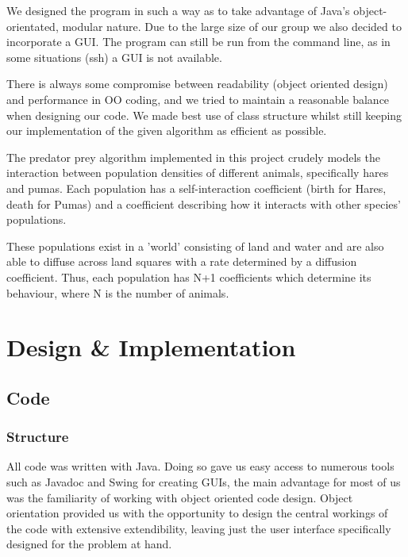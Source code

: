 \documentclass[11pt]{report}
\begin{document}

We designed the program in such a way as to take advantage of Java's object-orientated, modular nature. Due to the large size of our group we also decided to incorporate a GUI. The program can still be run from the command line, as in some situations (ssh) a GUI is not available.\newline{}

There is always some compromise between readability (object oriented design) and performance in OO coding, and we tried to maintain a reasonable balance when designing our code. We made best use of class structure whilst still keeping our implementation of the given algorithm as efficient as possible.\newline{}

The predator prey algorithm implemented in this project crudely models the interaction between population densities of different animals, specifically hares and pumas. Each population has a self-interaction coefficient (birth for Hares, death for Pumas) and a coefficient describing how it interacts with other species' populations. \newline{}

These populations exist in a 'world' consisting of land and water and are also able to diffuse across land squares with a rate determined by a diffusion coefficient. Thus, each population has N+1 coefficients which determine its behaviour, where N is the number of animals.

\chapter{Design \& Implementation}
   \section{Code}
      \subsection{Structure} %
          All code was written with Java. Doing so gave us easy access to numerous tools such as Javadoc and Swing for creating GUIs, the main advantage for most of us was the familiarity of working with object oriented code design. Object orientation provided us with the opportunity to design the central workings of the code with extensive extendibility, leaving just the user interface specifically designed for the problem at hand.
\end{document}
